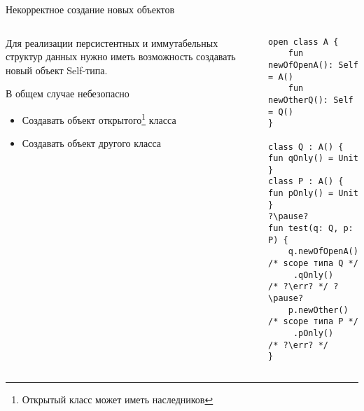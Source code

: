 \documentclass[handout,aspectratio=169,usenames,dvipsnames]{beamer}
\newcommand{\err}[0]{\textcolor{red}{ошибка}}
\begin{document}
\begin{frame}[fragile]{Некорректное создание новых объектов}
    \begin{columns}[onlytextwidth]
        \begin{column}{0.46\textwidth}
            Для реализации персистентных и иммутабельных структур данных нужно иметь возможность создавать новый объект Self-типа. \pause

            \vspace{1em}
            \begin{block}{В общем случае небезопасно}
                \begin{itemize}
                    \item Создавать объект открытого\footnote{Открытый класс может иметь наследников} класса
                    \item Создавать объект другого класса
                \end{itemize}
            \end{block}
        \end{column}\hfill%
        \begin{column}{0.49\textwidth}
            \pause
            \begin{verbatim}
open class A {
    fun newOfOpenA(): Self = A()
    fun newOtherQ(): Self = Q()
}

class Q : A() { fun qOnly() = Unit }
class P : A() { fun pOnly() = Unit }
?\pause?
fun test(q: Q, p: P) {
    q.newOfOpenA() /* scope типа Q */
     .qOnly()      /* ?\err? */ ?\pause?
    p.newOther()   /* scope типа P */
     .pOnly()      /* ?\err? */
}
            \end{verbatim}
        \end{column}
    \end{columns}
\end{frame}
\end{document}

